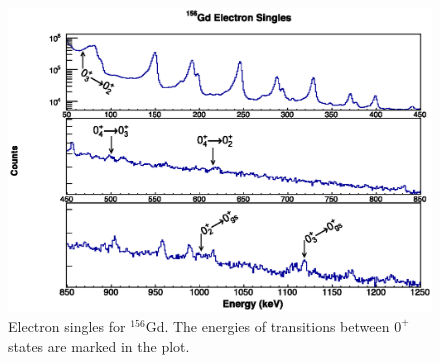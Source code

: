 \begin{figure}
    \centering
    \includegraphics[scale=0.8]{156GdTablesAndFigs/156Gd_Singles_Electron_Label.eps}
    \caption{Electron singles for $^{156}$Gd. The energies of transitions between $0^+$ states are marked in the plot.}
    \label{fig:156_e_singles}
\end{figure}